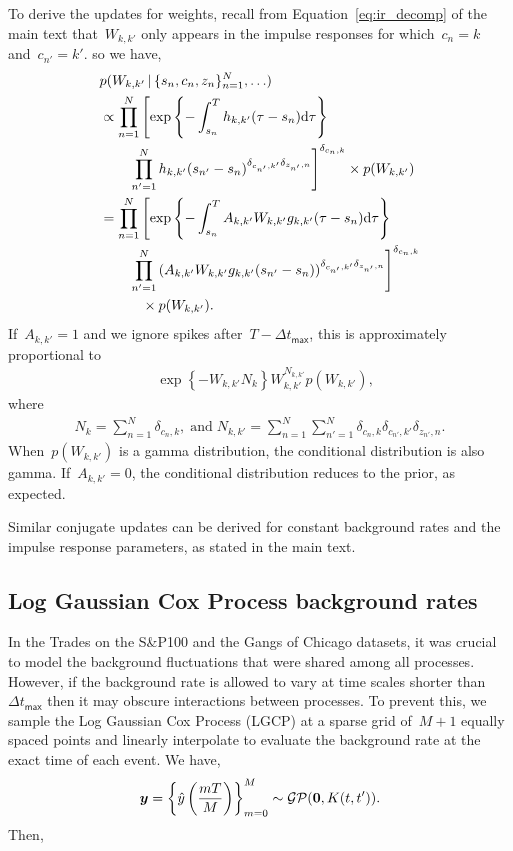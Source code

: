 To derive the updates for weights, recall from
Equation~\ref{eq:ir_decomp} of the main text that~${W_{k,k'}}$ only
appears in the impulse responses for which~${c_n=k}$
and~${c_{n'}=k'}$. so we have,
\begin{align*}
&p(W_{k,k'}\,|\, \{s_n,c_n,z_n\}^N_{n=1},\ldots) \\
&\propto\prod_{n=1}^N\left[ \exp\left\{-\int^T_{s_n} h_{k,k'}(\tau - s_n)\mathrm{d}\tau \right\}\right.\\
&\quad\quad\left.\prod_{n'=1}^N h_{k,k'}(s_{n'}-s_n)^{\delta_{c_{n'},k'}\delta_{z_{n'},n}}\right]^{\delta_{c_n,k}} \times p(W_{k,k'})\\
&=\prod_{n=1}^N\left[ \exp\left\{-\int^T_{s_n} A_{k,k'}W_{k,k'}g_{k,k'}(\tau - s_n)\mathrm{d}\tau \right\}\right.\\
&\quad\quad\left.\prod_{n'=1}^N \left(A_{k,k'}W_{k,k'}g_{k,k'}(s_{n'}-s_n)\right)^{\delta_{c_{n'},k'}\delta_{z_{n'},n}}\right]^{\delta_{c_n,k}}\\
&\quad\quad\quad\times p(W_{k,k'}).
\end{align*}
If~${A_{k,k'}=1}$ and we ignore spikes after~${T-\Delta
  t_{\mathsf{max}}}$, this is approximately proportional to
\begin{align*}
&\exp\left\{-W_{k,k'}N_k\right\} W_{k,k'}^{N_{k,k'}} p(W_{k,k'}),
\end{align*}
where
\begin{align*}
N_{k}=\sum_{n=1}^N \delta_{c_n,k},\;\text{and}\;
N_{k,k'}=\sum_{n=1}^N\sum_{n'=1}^N \delta_{c_n,k}\delta_{c_{n'},k'}\delta_{z_{n'},n}.
\end{align*}
When~${p(W_{k,k'})}$ is a gamma distribution, the conditional
distribution is also gamma. If~${A_{k,k'}=0}$, the conditional
distribution reduces to the prior, as expected.

Similar conjugate updates can be derived for constant background rates
and the impulse response parameters, as stated in the main text.

\subsection{Log Gaussian Cox Process background rates}
In the Trades on the S\&P100 and the Gangs of Chicago datasets, it was
crucial to model the background fluctuations that were shared among
all processes. However, if the background rate is allowed to vary at
time scales shorter than~${\Delta t_{\textsf{max}}}$ then it may
obscure interactions between processes. To prevent this, we sample the
Log Gaussian Cox Process (LGCP) at a sparse grid of~$M+1$ equally
spaced points and linearly interpolate to evaluate the background rate
at the exact time of each event. We have,
\begin{align*}
\boldsymbol{y}=\left\{\hat{y}\left(\frac{mT}{M}\right)\right\}_{m=0}^M \sim \mathcal{GP}(\boldsymbol{0},K(t,t')).
\end{align*}
Then,

